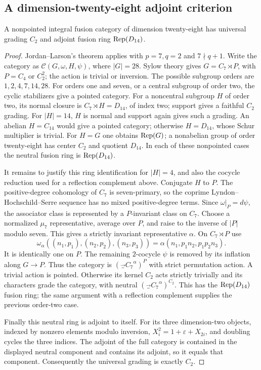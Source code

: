 \subsection{A dimension-twenty-eight adjoint criterion}
\begin{lemma}\label{lem:dim28}
A nonpointed integral fusion category of dimension twenty-eight has
universal grading $C_2$ and adjoint fusion ring $\operatorname{Rep}(D_{14})$.
\end{lemma}
\begin{proof}
Jordan--Larson's theorem \cite[Theorem~1.1]{JordanLarson} applies with
$p=7,q=2$ and $7\nmid q+1$. Write the category as
$\mathcal C(G,\omega,H,\psi)$, where $|G|=28$.
Sylow theory gives $G=C_7\rtimes P$, with $P=C_4$ or $C_2^2$;
the action is trivial or inversion. The possible subgroup orders are
$1,2,4,7,14,28$. For orders one and seven, or a central subgroup of
order two, the cyclic stabilizers give a pointed category.
For a noncentral subgroup $H$ of order two, its normal closure is
$C_7\rtimes H=D_{14}$, of index two; support gives a faithful $C_2$
grading. For $|H|=14$, $H$ is normal and support again gives such a
grading. An abelian $H=C_{14}$ would give a pointed category; otherwise
$H=D_{14}$, whose Schur multiplier is trivial. For $H=G$ one obtains
$\operatorname{Rep}(G)$; a nonabelian group of order twenty-eight has center $C_2$
and quotient $D_{14}$. In each of these nonpointed cases the neutral
fusion ring is $\operatorname{Rep}(D_{14})$.

It remains to justify this ring identification for $|H|=4$, and also
the cocycle reduction used for a reflection complement above.
Conjugate $H$ to $P$. The positive-degree cohomology of $C_7$ is
seven-primary, so the coprime Lyndon--Hochschild--Serre sequence has
no mixed positive-degree terms. Since $\omega|_P=d\psi$, the
associator class is represented by a $P$-invariant class on $C_7$.
Choose a normalized $\mu_7$ representative, average over $P$, and
raise to the inverse of $|P|$ modulo seven. This gives a strictly
invariant representative $\alpha$. On $C_7\rtimes P$ use
\[
\omega_\alpha((n_1,p_1),(n_2,p_2),(n_3,p_3))
 =\alpha(n_1,p_1n_2,p_1p_2n_3).
\]
It is identically one on $P$. The remaining $2$-cocycle $\psi$ is
removed by its inflation along $G\to P$. Thus the category is
$(\Vec_{C_7}^{\alpha})^P$ with strict permutation action.
A trivial action is pointed. Otherwise its kernel $C_2$ acts strictly
trivially and its characters grade the category, with neutral
$(\Vec_{C_7}^{\alpha})^{C_2}$. This has the $\operatorname{Rep}(D_{14})$ fusion
ring; the same argument with a reflection complement supplies the
previous order-two case.

Finally this neutral ring is adjoint to itself. For its three
dimension-two objects, indexed by nonzero elements modulo inversion,
$X_i^2=1+\varepsilon+X_{2i}$, and doubling cycles the three indices.
The adjoint of the full category is contained in the displayed neutral
component and contains its adjoint, so it equals that component.
Consequently the universal grading is exactly $C_2$.
\end{proof}


